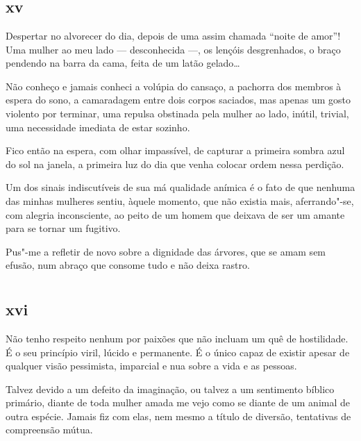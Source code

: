\chapter*{}
\section{xv}

\noindent{}Despertar no alvorecer do dia, depois de uma assim chamada ``noite de
amor''! Uma mulher ao meu lado --- desconhecida ---, os lençóis
desgrenhados, o braço pendendo na barra da cama, feita de um latão
gelado\ldots{}

Não conheço e jamais conheci a volúpia do cansaço, a pachorra dos
membros à espera do sono, a camaradagem entre dois corpos saciados, mas
apenas um gosto violento por terminar, uma repulsa obstinada pela mulher
ao lado, inútil, trivial, uma necessidade imediata de estar sozinho.

Fico então na espera, com olhar impassível, de capturar a primeira
sombra azul do sol na janela, a primeira luz do dia que venha colocar
ordem nessa perdição.

Um dos sinais indiscutíveis de sua má qualidade anímica é o fato de que
nenhuma das minhas mulheres sentiu, àquele momento, que não existia
mais, aferrando"-se, com alegria inconsciente, ao peito de um homem que
deixava de ser um amante para se tornar um fugitivo.

Pus"-me a refletir de novo sobre a dignidade das árvores, que se amam sem
efusão, num abraço que consome tudo e não deixa rastro.

\chapter*{}
\section{xvi}

\noindent{}Não tenho respeito nenhum por paixões que não incluam um quê de
hostilidade. É o seu princípio viril, lúcido e permanente. É o único
capaz de existir apesar de qualquer visão pessimista, imparcial e nua
sobre a vida e as pessoas.

Talvez devido a um defeito da imaginação, ou talvez a um
sentimento bíblico primário, diante de toda mulher amada me vejo como
se diante de um animal de outra espécie. Jamais fiz com elas, nem mesmo
a título de diversão, tentativas de compreensão mútua.

